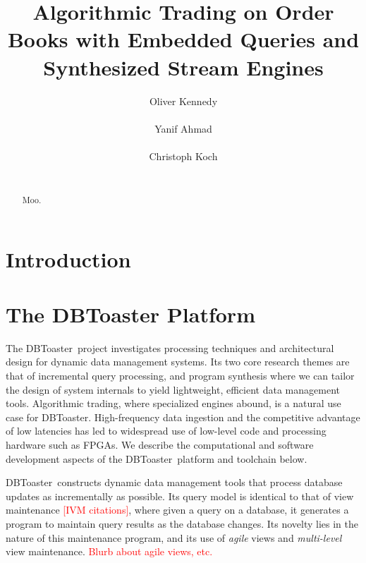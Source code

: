 \documentclass{vldb}
\newcommand{\compiler}{DBToaster}
\newcommand{\tinysection}[1]{\noindent{\bf #1.}}
\newcommand{\todo}[1]{\textcolor{red}{#1}}
\begin{document}
\title{Algorithmic Trading on Order Books with Embedded Queries and Synthesized
Stream Engines}
\author{
\alignauthor
Oliver Kennedy\\
\\
\alignauthor
Yanif Ahmad\\
\\
\alignauthor
Christoph Koch\\
\\
}
\maketitle

\begin{abstract}
Moo.
\end{abstract}

\section{Introduction}

\section{The DBToaster Platform}

The \compiler\ project investigates processing techniques and architectural
design for dynamic data management systems. Its two core research themes are
that of incremental query processing, and program synthesis where we can tailor
the design of system internals to yield lightweight, efficient data management
tools. Algorithmic trading, where specialized engines abound, is a natural use
case for \compiler. High-frequency data ingestion and the competitive advantage
of low latencies has led to widespread use of low-level code and
processing hardware such as FPGAs. We describe the computational and software
development aspects of the \compiler\ platform and toolchain below.

\tinysection{Dynamic Data Management}
\compiler\ constructs dynamic data management tools that process database
updates as incrementally as possible. Its query model is identical to that of
view maintenance \todo{[IVM citations]}, where given a query on a database, it
generates a program to maintain query results as the database changes. Its
novelty lies in the nature of this maintenance program, and its use of
\textit{agile} views and \textit{multi-level} view maintenance.
\todo{Blurb about agile views, etc.}
\end{document}
